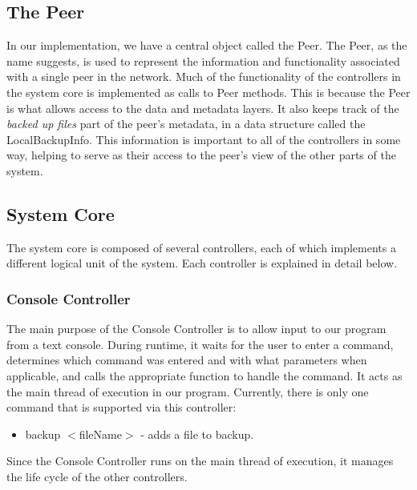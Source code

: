 \documentclass[12pt]{report}
\begin{document}
\subsection{The Peer}
In our implementation, we have a central object called the Peer. The Peer, as the name suggests, is used to represent the information and functionality associated with a single peer in the network. Much of the functionality of the controllers in the system core is implemented as calls to Peer methods. This is because the Peer is what allows access to the data and metadata layers. It also keeps track of the \textit{backed up files} part of the peer's metadata, in a data structure called the LocalBackupInfo. This information is important to all of the controllers in some way, helping to serve as their access to the peer's view of the other parts of the system.

\subsection{System Core}
The system core is composed of several controllers, each of which implements a different logical unit of the system. Each controller is explained in detail below.

\subsubsection{Console Controller}
The main purpose of the Console Controller is to allow input to our program from a text console. During runtime, it waits for the user to enter a command, determines which command was entered and with what parameters when applicable, and calls the appropriate function to handle the command. It acts as the main thread of execution in our program. Currently, there is only one command that is supported via this controller:
\begin{itemize}
\item backup  $<$fileName$>$ - adds a file to backup.
\end{itemize}

Since the Console Controller runs on the main thread of execution, it manages the life cycle of the other controllers.
\end{document}
